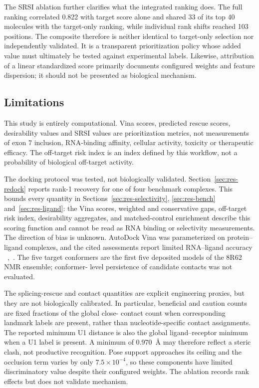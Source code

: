 \documentclass[journal]{IEEEtran}
\begin{document}
The SRSI ablation further clarifies what the integrated ranking does.
The full ranking correlated 0.822 with target score alone and shared 33
of its top 40 molecules with the target-only ranking, while individual
rank shifts reached 103 positions. The composite therefore is neither
identical to target-only selection nor independently validated. It is a
transparent prioritization policy whose added value must ultimately be
tested against experimental labels. Likewise, attribution of a linear
standardized score primarily documents configured weights and feature
dispersion; it should not be presented as biological mechanism.

\subsection{Limitations}
\label{sec:limits}

This study is entirely computational. Vina scores, predicted rescue
scores, desirability values and SRSI values are prioritization metrics,
not measurements of exon 7 inclusion, RNA-binding affinity, cellular
activity, toxicity or therapeutic efficacy. The off-target risk index is
an index defined by this workflow, not a probability of biological
off-target activity.

The docking protocol was tested, not biologically validated.
Section~\ref{sec:res-redock} reports rank-1 recovery for one of four
benchmark complexes. This bounds every quantity in
Sections~\ref{sec:res-selectivity}, \ref{sec:res-bench}
and~\ref{sec:res-ligand}: the Vina scores, weighted and conservative
gaps, off-target risk index, desirability aggregates, and matched-control
enrichment describe this scoring function and cannot be read as RNA
binding or selectivity measurements. The direction of bias is unknown.
AutoDock Vina was parameterized on protein--ligand complexes, and the
cited assessments report limited RNA--ligand accuracy
~\cite{agarwal2023},~\cite{gunasinghe2024}. The five target conformers
are the first five deposited models of the 8R62 NMR ensemble; conformer-
level persistence of candidate contacts was not evaluated.

The splicing-rescue and contact quantities are explicit engineering
proxies, but they are not biologically calibrated. In particular,
beneficial and caution counts are fixed fractions of the global close-
contact count when corresponding landmark labels are present, rather
than nucleotide-specific contact assignments. The reported minimum U1
distance is also the global ligand--receptor minimum when a U1 label is
present. A minimum of 0.970~\AA{} may therefore reflect a steric clash,
not productive recognition. Pose support approaches its ceiling and the
occlusion term varies by only $7.5\times10^{-4}$, so these components
have limited discriminatory value despite their configured weights. The
ablation records rank effects but does not validate mechanism.
\end{document}
